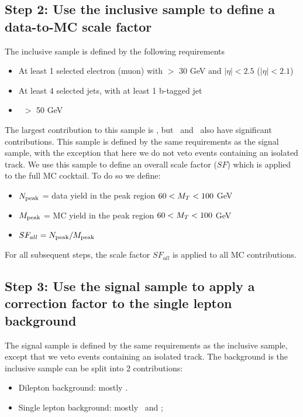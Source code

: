 \subsection{Step 2: Use the inclusive sample to define a data-to-MC scale factor}

The inclusive sample is defined by the following requirements

\begin{itemize}
\item At least 1 selected electron (muon) with \pt $>$ 30 GeV and $|\eta|<2.5$ ($|\eta|<2.1$)
\item At least 4 selected jets, with at least 1 b-tagged jet
\item \MET\ $>$ 50 GeV
\end{itemize}

The largest contribution to this sample is \ttlj, but \wjets\ and \ttll\ also have significant contributions.
This sample is defined by the same requirements as the signal sample, with the exception that here we do not
veto events containing an isolated track. We use this sample to define an overall scale factor ($SF$) which is applied
to the full MC cocktail. To do so we define:

\begin{itemize}
\item $N_{\rm{peak}}$ = data yield in the peak region $60<M_T<100$ GeV
\item $M_{\rm{peak}}$ = MC yield in the peak region $60<M_T<100$ GeV
\item $SF_{all} = N_{\rm{peak}} / M_{\rm{peak}}$
\end{itemize}

For all subsequent steps, the scale factor $SF_{all}$ is applied to all MC contributions.

\subsection{Step 3: Use the signal sample to apply a correction factor to the single lepton background}

The signal sample is defined by the same requirements as the inclusive sample, except that we veto events containing
an isolated track. The background is the inclusive sample can be split into 2 contributions:

\begin{itemize}
\item Dilepton background: mostly \ttll.
\item Single lepton background: mostly \ttlj\ and \wjets;
\end{itemize}

